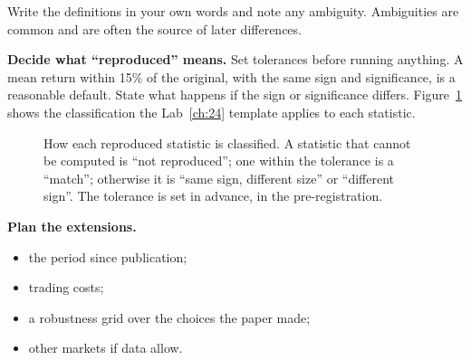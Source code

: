 Write the definitions in your own words and note any ambiguity. Ambiguities are common and are often the source of later differences.

\textbf{Decide what ``reproduced'' means.} Set tolerances before running anything. A mean return within 15\% of the original, with the same sign and significance, is a reasonable default. State what happens if the sign or significance differs. Figure~\ref{fig:24-status} shows the classification the Lab~\ref{ch:24} template applies to each statistic.

\begin{figure}[htbp]
\centering
{}
\caption{How each reproduced statistic is classified. A statistic that cannot be computed is ``not reproduced''; one within the tolerance is a ``match''; otherwise it is ``same sign, different size'' or ``different sign''. The tolerance is set in advance, in the pre-registration.}
\label{fig:24-status}
\end{figure}

\textbf{Plan the extensions.}

\begin{itemize}
  \item the period since publication;
  \item trading costs;
  \item a robustness grid over the choices the paper made;
  \item other markets if data allow.
\end{itemize}

